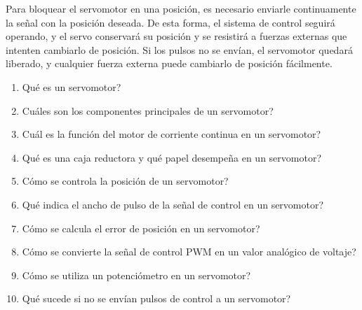 \documentclass[../main]{subfiles}
\begin{document}
Para bloquear el servomotor en una posici\'on{}, es necesario enviarle continuamente la se\~nal{} con la posici\'on{} deseada. De esta forma, el sistema de control seguir\'a{} operando, y el servo conservar\'a{} su posici\'on{} y se resistir\'a{} a fuerzas externas que intenten cambiarlo de posici\'on{}. Si los pulsos no se env\'ian{}, el servomotor quedar\'a{} liberado, y cualquier fuerza externa puede cambiarlo de posici\'on{} f\'acilmente.

\begin{enumerate}
\item \textquestiondown{}Qu\'e{} es un servomotor?
\item \textquestiondown{}Cu\'ales{} son los componentes principales de un servomotor?
\item \textquestiondown{}Cu\'al{} es la funci\'on{} del motor de corriente continua en un servomotor?
\item \textquestiondown{}Qu\'e{} es una caja reductora y qu\'e{} papel desempe\~na{} en un servomotor?
\item \textquestiondown{}C\'omo{} se controla la posici\'on{} de un servomotor?
\item \textquestiondown{}Qu\'e{} indica el ancho de pulso de la se\~nal{} de control en un servomotor?
\item \textquestiondown{}C\'omo{} se calcula el error de posici\'on{} en un servomotor?
\item \textquestiondown{}C\'omo{} se convierte la se\~nal{} de control PWM en un valor anal\'ogico{} de voltaje?
\item \textquestiondown{}C\'omo{} se utiliza un potenci\'ometro{} en un servomotor?
\item \textquestiondown{}Qu\'e{} sucede si no se env\'ian{} pulsos de control a un servomotor?
\end{enumerate}
\end{document}
